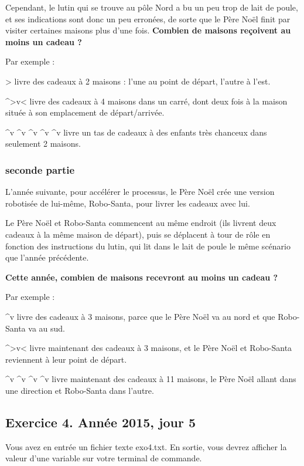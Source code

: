 Cependant, le lutin qui se trouve au pôle Nord a bu un peu trop de lait de poule, et ses indications sont donc un peu erronées, de sorte que le Père Noël finit par visiter certaines maisons plus d'une fois. \textbf{Combien de maisons reçoivent au moins un cadeau ?}

Par exemple :

    > livre des cadeaux à 2 maisons : l'une au point de départ, l'autre à l'est.
    
     	\textasciicircum >v< livre des cadeaux à 4 maisons dans un carré, dont deux fois à la maison située à son emplacement de départ/arrivée.
    
     	\textasciicircum v 	\textasciicircum v 	\textasciicircum v 	\textasciicircum v 	\textasciicircum v livre un tas de cadeaux à des enfants très chanceux dans seulement 2 maisons.


\subsubsection{seconde partie}
L'année suivante, pour accélérer le processus, le Père Noël crée une version robotisée de lui-même, Robo-Santa, pour livrer les cadeaux avec lui.

Le Père Noël et Robo-Santa commencent au même endroit (ils livrent deux cadeaux à la même maison de départ), puis se déplacent à tour de rôle en fonction des instructions du lutin, qui lit dans le lait de poule le même scénario que l'année précédente.

\textbf{Cette année, combien de maisons recevront au moins un cadeau ?}

Par exemple :

     	\textasciicircum v livre des cadeaux à 3 maisons, parce que le Père Noël va au nord et que Robo-Santa va au sud.
    
     	\textasciicircum >v< livre maintenant des cadeaux à 3 maisons, et le Père Noël et Robo-Santa reviennent à leur point de départ.
    
     	\textasciicircum v 	\textasciicircum v 	\textasciicircum v 	\textasciicircum v livre maintenant des cadeaux à 11 maisons, le Père Noël allant dans une direction et Robo-Santa dans l'autre.


\subsection{Exercice 4. Année 2015, jour 5}

Vous avez en entrée un fichier texte exo4.txt.
En sortie, vous devrez afficher la valeur d'une variable sur votre terminal de commande.

